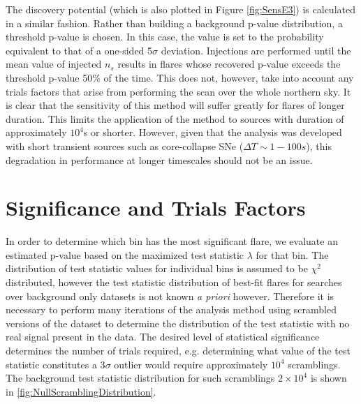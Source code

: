 \documentclass{gatech-thesis}
\begin{document}
The discovery potential (which is also plotted in Figure \ref{fig:SensE3}) is calculated in a similar fashion. Rather than building a background p-value distribution, a threshold p-value is chosen. In this case, the value is set to the probability equivalent to that of a one-sided 5$\sigma$ deviation. Injections are performed until the mean value of injected $n_s$ results in flares whose recovered p-value exceeds the threshold p-value 50\% of the time. This does not, however, take into account any trials factors that arise from performing the scan over the whole northern sky. It is clear that the sensitivity of this method will suffer greatly for flares of longer duration. This limits the application of the method to sources with duration of approximately $10^4$s or shorter. However, given that the analysis was developed with short transient sources such as core-collapse SNe ($\Delta T \sim 1-100s$), this degradation in performance at longer timescales should not be an issue.

\section{Significance and Trials Factors}
In order to determine which bin has the most significant flare, we evaluate an estimated p-value based on the maximized test statistic $\lambda$ for that bin. The distribution of test statistic values for individual bins is assumed to be $\chi^2$ distributed, however the test statistic distribution of best-fit flares for searches over background only datasets is not known \textit{a priori} however. Therefore it is necessary to perform many iterations of the analysis method using scrambled versions of the dataset to determine the distribution of the test statistic with no real signal present in the data. The desired level of statistical significance determines the number of trials required, e.g. determining what value of the test statistic constitutes a 3$\sigma$ outlier would require approximately $10^4$ scramblings. The background test statistic distribution for such scramblings $2\times 10^4$ is shown in \ref{fig:NullScramblingDistribution}.
\end{document}
